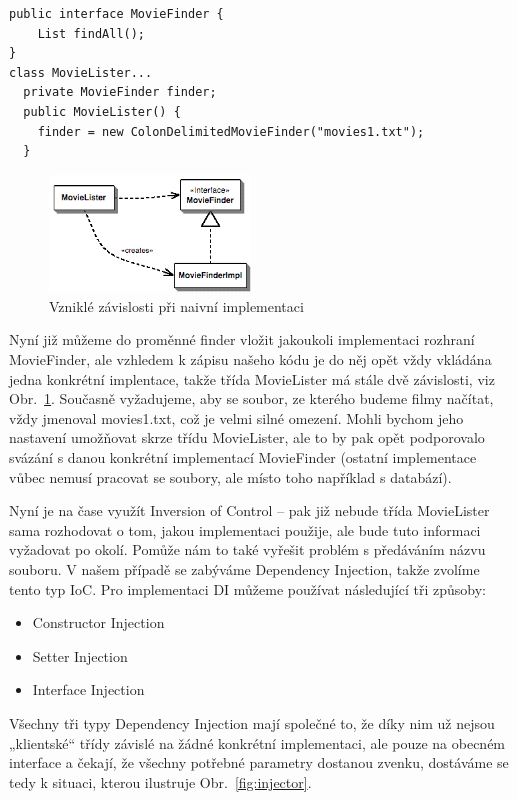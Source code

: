 \documentclass[a4paper,conference]{IEEEtran}
\newcommand{\fig}[1]{Obr.~\ref{fig:#1}}      %
\begin{document}
\lstset{language=Java, caption=Naplnění proměnné finder s využitím interface, label=listing:Java}
\begin{lstlisting}
public interface MovieFinder {
    List findAll();
}
class MovieLister...
  private MovieFinder finder;
  public MovieLister() {
    finder = new ColonDelimitedMovieFinder("movies1.txt");
  }
\end{lstlisting}

\begin{figure}[!b]
\centering
\includegraphics[width=2.1in]{1-Naive}
\caption{Vzniklé závislosti při naivní implementaci}
\label{fig:naive}
\end{figure}

Nyní již můžeme do proměnné finder vložit jakoukoli implementaci rozhraní MovieFinder, ale vzhledem k zápisu našeho kódu je do něj opět vždy vkládána jedna konkrétní implentace, takže třída MovieLister má stále dvě závislosti, viz \fig{naive}. Současně vyžadujeme, aby se soubor, ze kterého budeme filmy načítat, vždy jmenoval movies1.txt, což je velmi silné omezení. Mohli bychom jeho nastavení umožňovat skrze třídu MovieLister, ale to by pak opět podporovalo svázání s danou konkrétní implementací MovieFinder (ostatní implementace vůbec nemusí pracovat se soubory, ale místo toho například s databází).

Nyní je na čase využít Inversion of Control – pak již nebude třída MovieLister sama rozhodovat o tom, jakou implementaci použije, ale bude tuto informaci vyžadovat po okolí. Pomůže nám to také vyřešit problém s předáváním názvu souboru. V našem případě se zabýváme Dependency Injection, takže zvolíme tento typ IoC. Pro implementaci DI můžeme používat následující tři způsoby:

\begin{itemize}
\item{Constructor Injection} 
\item{Setter Injection} 
\item{Interface Injection} 
\end{itemize}

Všechny tři typy Dependency Injection mají společné to, že díky nim už nejsou „klientské“ třídy závislé na žádné konkrétní implementaci, ale pouze na obecném interface a čekají, že všechny potřebné parametry dostanou zvenku, dostáváme se tedy k situaci, kterou ilustruje \fig{injector}.
\end{document}

